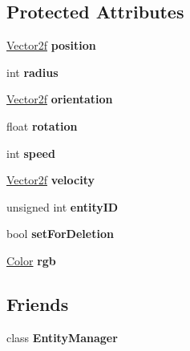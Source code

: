 \subsection*{Protected Attributes}
\begin{DoxyCompactItemize}
\item 
\hypertarget{classEntity_a6af9d6498134ad0906011778bc5736db}{\hyperlink{classVector2}{Vector2f} {\bfseries position}}\label{classEntity_a6af9d6498134ad0906011778bc5736db}

\item 
\hypertarget{classEntity_acd7af12063926ab8cd654539328e5532}{int {\bfseries radius}}\label{classEntity_acd7af12063926ab8cd654539328e5532}

\item 
\hypertarget{classEntity_a5fa136f1d80e45ecf5c44199684af15d}{\hyperlink{classVector2}{Vector2f} {\bfseries orientation}}\label{classEntity_a5fa136f1d80e45ecf5c44199684af15d}

\item 
\hypertarget{classEntity_aa384ccfdaba36b1ff5f5db51ec3cdcb1}{float {\bfseries rotation}}\label{classEntity_aa384ccfdaba36b1ff5f5db51ec3cdcb1}

\item 
\hypertarget{classEntity_a12ea871d945d59cbf57b8f8f7d2179ed}{int {\bfseries speed}}\label{classEntity_a12ea871d945d59cbf57b8f8f7d2179ed}

\item 
\hypertarget{classEntity_a89d61354233997a696f1e0f82ecb9372}{\hyperlink{classVector2}{Vector2f} {\bfseries velocity}}\label{classEntity_a89d61354233997a696f1e0f82ecb9372}

\item 
\hypertarget{classEntity_aedfb34471b8e55194d5c93603ed23158}{unsigned int {\bfseries entity\-I\-D}}\label{classEntity_aedfb34471b8e55194d5c93603ed23158}

\item 
\hypertarget{classEntity_a2b8ccf8a215e4880a123b1c452438b01}{bool {\bfseries set\-For\-Deletion}}\label{classEntity_a2b8ccf8a215e4880a123b1c452438b01}

\item 
\hypertarget{classEntity_a98cdd3a9cc6efbecde0ad90ef349574c}{\hyperlink{classColor}{Color} {\bfseries rgb}}\label{classEntity_a98cdd3a9cc6efbecde0ad90ef349574c}

\end{DoxyCompactItemize}
\subsection*{Friends}
\begin{DoxyCompactItemize}
\item 
\hypertarget{classEntity_a6f579cda6059d102e9074e11a27e0282}{class {\bfseries Entity\-Manager}}\label{classEntity_a6f579cda6059d102e9074e11a27e0282}

\end{DoxyCompactItemize}


